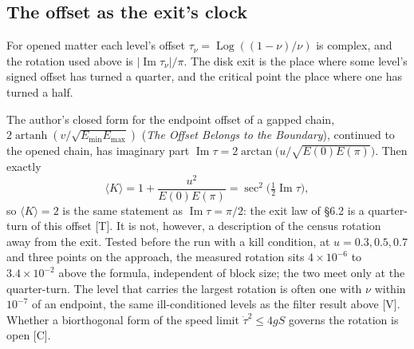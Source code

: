 \documentclass[11pt]{article}
\theoremstyle{definition}
\newcommand{\grade}[1]{\textsf{\small[#1]}}
\begin{document}
\subsection{The offset as the exit's clock}
For opened matter each level's offset $\tau_\nu=\operatorname{Log}((1-\nu)/\nu)$ is complex, and the rotation used above is $|\operatorname{Im}\tau_\nu|/\pi$. The disk exit is the place where some level's signed offset has turned a quarter, and the critical point the place where one has turned a half.

The author's closed form for the endpoint offset of a gapped chain, $2\operatorname{artanh}(v/\sqrt{E_{\min}E_{\max}})$ (\emph{The Offset Belongs to the Boundary}), continued to the opened chain, has imaginary part $\operatorname{Im}\tau=2\arctan\big(u/\sqrt{E(0)E(\pi)}\big)$. Then exactly
\[
\langle K\rangle=1+\frac{u^2}{E(0)E(\pi)}=\sec^2\!\Big(\tfrac12\operatorname{Im}\tau\Big),
\]
so $\langle K\rangle=2$ is the same statement as $\operatorname{Im}\tau=\pi/2$: the exit law of §6.2 is a quarter-turn of this offset \grade{T}. It is not, however, a description of the census rotation away from the exit. Tested before the run with a kill condition, at $u=0.3,0.5,0.7$ and three points on the approach, the measured rotation sits $4\times10^{-6}$ to $3.4\times10^{-2}$ above the formula, independent of block size; the two meet only at the quarter-turn. The level that carries the largest rotation is often one with $\nu$ within $10^{-7}$ of an endpoint, the same ill-conditioned levels as the filter result above \grade{V}. Whether a biorthogonal form of the speed limit $\dot\tau^2\le4gS$ governs the rotation is open \grade{C}.
\end{document}
